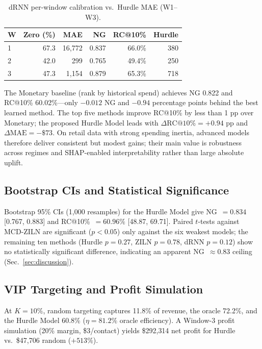 \documentclass[pdflatex,sn-mathphys-num]{sn-jnl}
\theoremstyle{thmstyleone}
\theoremstyle{thmstyletwo}
\theoremstyle{thmstylethree}
\begin{document}
\begin{table}[t]
\caption{dRNN per-window calibration vs.\ Hurdle MAE (W1--W3).}
\label{tab:drnn_windows}
\scriptsize
\begin{tabular*}{\columnwidth}{@{\extracolsep\fill}lrrrrr@{}}
\toprule
\textbf{W} & \textbf{Zero (\%)} & \textbf{MAE} & \textbf{NG} &
\textbf{RC@10\%} & \textbf{Hurdle} \\
\midrule
1 & 67.3 & 16{,}772 & 0.837 & 66.0\% & 380 \\
2 & 42.0 & 299 & 0.765 & 49.4\% & 250 \\
3 & 47.3 & 1{,}154 & 0.879 & 65.3\% & 718 \\
\bottomrule
\end{tabular*}
\end{table}

The Monetary baseline (rank by historical spend) achieves NG 0.822 and
RC@10\% 60.02\%---only $-0.012$ NG and $-0.94$ percentage points behind
the best learned method. The top five methods improve RC@10\% by less
than 1 pp over Monetary; the proposed Hurdle Model leads with
$\Delta\mathrm{RC@10\%}{=}+0.94$ pp and $\Delta\mathrm{MAE}{=}-\$73$.
On retail data with strong spending inertia, advanced models therefore
deliver consistent but modest gains; their main value is robustness
across regimes and SHAP-enabled interpretability rather than large
absolute uplift.

\subsection{Bootstrap CIs and Statistical Significance}

Bootstrap 95\% CIs (1{,}000 resamples) for the Hurdle Model give
NG~$=0.834$ [0.767, 0.883] and RC@10\%~$=60.96\%$ [48.87, 69.71].
Paired $t$-tests against MCD-ZILN are significant ($p<0.05$) only
against the six weakest models; the remaining ten methods (Hurdle
$p{=}0.27$, ZILN $p{=}0.78$, dRNN $p{=}0.12$) show no statistically
significant difference, indicating an apparent NG~$\!\approx\!0.83$
ceiling (Sec.~\ref{sec:discussion}).

\subsection{VIP Targeting and Profit Simulation}

At $K{=}10\%$, random targeting captures 11.8\% of revenue, the oracle
72.2\%, and the Hurdle Model 60.8\% ($\eta{=}81.2\%$ oracle efficiency).
A Window-3 profit simulation (20\% margin, \$3/contact) yields
\$292{,}314 net profit for Hurdle vs.\ \$47{,}706 random ($+513\%$).
\end{document}
